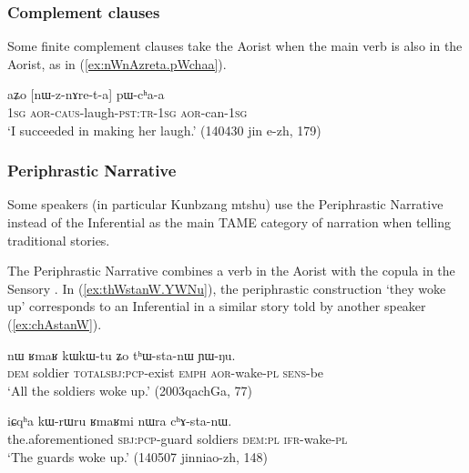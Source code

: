 \subsubsection{Complement clauses }   \label{sec:aor.complement} 
Some finite complement clauses take the Aorist when the main verb is also in the Aorist, as in (\ref{ex:nWnAzreta.pWchaa}). 

 \begin{exe}
\ex \label{ex:nWnAzreta.pWchaa}
\gll aʑo [nɯ-z-nɤre-t-a] pɯ-cʰa-a \\
\textsc{1sg} \textsc{aor}-\textsc{caus}-laugh-\textsc{pst}:\textsc{tr}-\textsc{1sg} \textsc{aor}-can-\textsc{1sg} \\
\glt `I succeeded in making her laugh.' (140430 jin e-zh, 179)
\end{exe}

\subsubsection{Periphrastic Narrative }   \label{sec:aor.narrative}
Some speakers (in particular Kunbzang mtshu) use the Periphrastic Narrative instead of the Inferential as the main TAME category of narration when telling traditional stories.

The Periphrastic Narrative combines a verb in the Aorist with the copula in the Sensory . In (\ref{ex:thWstanW.YWNu}), the periphrastic construction  `they woke up' corresponds to an Inferential  in a similar story told by another speaker (\ref{ex:chAstanW}).

\begin{exe}
\ex \label{ex:thWstanW.YWNu}
\gll  nɯ ʁmaʁ kɯ\redp{}kɯ-tu ʑo tʰɯ-sta-nɯ ɲɯ-ŋu. \\
\textsc{dem} soldier \textsc{total}\redp{}\textsc{sbj}:\textsc{pcp}-exist \textsc{emph} \textsc{aor}-wake-\textsc{pl} \textsc{sens}-be \\
\glt `All the soldiers woke up.' (2003qachGa, 77)
\end{exe}

\begin{exe}
\ex \label{ex:chAstanW}
\gll iɕqʰa kɯ-rɯru ʁmaʁmi nɯra cʰɤ-sta-nɯ. \\
the.aforementioned \textsc{sbj}:\textsc{pcp}-guard soldiers \textsc{dem}:\textsc{pl} \textsc{ifr}-wake-\textsc{pl} \\
\glt `The guards woke up.' (140507 jinniao-zh, 148)
\end{exe}

